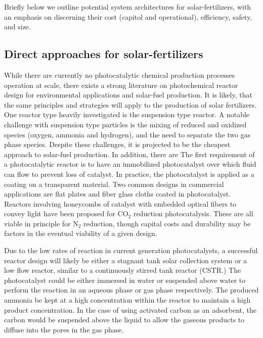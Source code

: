  Briefly below we outline potential system architectures for solar-fertilizers, with an emphasis on discerning their cost (capitol and operational), efficiency, safety, and size.

\subsection*{Direct approaches for solar-fertilizers}

While there are currently no photocatalytic chemical production processes operation at scale, there exists a strong literature on photochemical reactor design for environmental applications and solar-fuel production.\cite{Mckone_2013,Birnie2006,walter_2010} It is likely, that the same principles and strategies will apply to the production of solar fertilizers. One reactor type heavily investigated is the suspension type reactor. A notable challenge with suspension type particles is the mixing of reduced and oxidized species (oxygen, ammonia and hydrogen), and the need to separate the two gas phase species. Despite these challenges, it is projected to be the cheapest approach to solar-fuel production.  In addition, there are  The first requirement of a photocatalytic reactor is to have an immobilized photocatalyst over which fluid can flow to prevent loss of catalyst. In practice, the photocatalyst is applied as a coating on a transparent material. Two common designs in commercial applications are flat plates\cite{Brandi_1999} and fiber glass cloths\cite{Horikoshi_2002} coated in photocatalyst. Reactors involving honeycombs of catalyst with embedded optical fibers to convey light have been proposed for CO$_2$ reduction photocatalysis.\cite{Ola_2015} These are all viable in principle for N$_2$ reduction, though capital costs and durability may be factors in the eventual viability of a given design.

Due to the low rates of reaction in current generation photocatalysts, a successful reactor design will likely be either a stagnant tank solar collection system or a low flow reactor, similar to a continuously stirred tank reactor (CSTR.) The photocatalyst could be either immersed in water or suspended above water to perform the reaction in an aqueous phase or gas phase respectively. The produced ammonia be kept at a high concentration within the reactor to maintain a high product concentration. In the case of using activated carbon as an adsorbent, the carbon would be suspended above the liquid to allow the gaseous products to diffuse into the pores in the gas phase.

